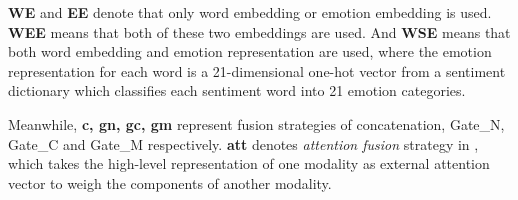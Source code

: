 \documentclass{article}
\begin{document}
	\textbf{WE} and \textbf{EE} denote that only word embedding or emotion embedding is used. \textbf{WEE} means that both of these two embeddings are used. And \textbf{WSE} means that both word embedding and emotion representation are used, where the emotion representation for each word is a 21-dimensional one-hot vector from a sentiment dictionary which classifies each sentiment word into 21 emotion categories.
	
	Meanwhile, \textbf{c, gn, gc, gm} represent fusion strategies of concatenation, Gate\_N, Gate\_C and Gate\_M respectively. \textbf{att} denotes {\em attention fusion} strategy in \cite{jin2017multimodal}, which takes the high-level representation of one modality as external attention vector to weigh the components of another modality.
	
	
\end{document}
